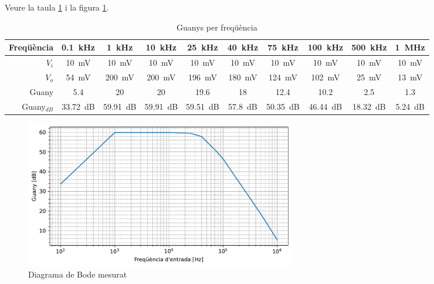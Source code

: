 \documentclass[catalan, a4paper, nobib]{tufte-handout}
\begin{document}
\newpage

 Veure la taula \ref{tab:t2} i la figura \ref{fig:f2}.

\begin{table}[h]
  \begin{center}
    \begin{tabular}{@{}rccccccccc@{}}
      \toprule
      Freqüència & \qty{0.1}{\kilo\hertz} & \qty{1}{\kilo\hertz} & \qty{10}{\kilo\hertz} & \qty{25}{\kilo\hertz} & \qty{40}{\kilo\hertz} & \qty{75}{\kilo\hertz} & \qty{100}{\kilo\hertz} & \qty{500}{\kilo\hertz} & \qty{1}{\mega\hertz} \\
      \midrule
      $V_i$ &  \qty{10}{\milli\volt} & \qty{10}{\milli\volt} & \qty{10}{\milli\volt} & \qty{10}{\milli\volt} & \qty{10}{\milli\volt} & \qty{10}{\milli\volt} & \qty{10}{\milli\volt} & \qty{10}{\milli\volt} & \qty{10}{\milli\volt} \\
      \midrule
      $V_o$ & \qty{54}{\milli\volt} & \qty{200}{\milli\volt} & \qty{200}{\milli\volt} & \qty{196}{\milli\volt} & \qty{180}{\milli\volt} & \qty{124}{\milli\volt} & \qty{102}{\milli\volt} & \qty{25}{\milli\volt} & \qty{13}{\milli\volt} \\
      \midrule
      Guany & \num{5.4} & \num{20} & \num{20} & \num{19.6} & \num{18} & \num{12.4} & \num{10.2} & \num{2.5} & \num{1.3} \\
      \midrule
      Guany${}_{dB}$ & \qty{33.72}{\deci\bel} & \qty{59.91}{\deci\bel} & \qty{59.91}{\deci\bel} & \qty{59.51}{\deci\bel} & \qty{57.8}{\deci\bel} & \qty{50.35}{\deci\bel} & \qty{46.44}{\deci\bel} & \qty{18.32}{\deci\bel} & \qty{5.24}{\deci\bel} \\
      \bottomrule
    \end{tabular}
  \end{center}
  \caption{Guanys per freqüència}
  \label{tab:t2}
\end{table}

\begin{figure}[h]
  \begin{center}
    \includegraphics[width=450px]{s1_graph.pdf}
  \end{center}
  \caption{Diagrama de Bode mesurat}
  \label{fig:f2}
\end{figure}
\end{document}
